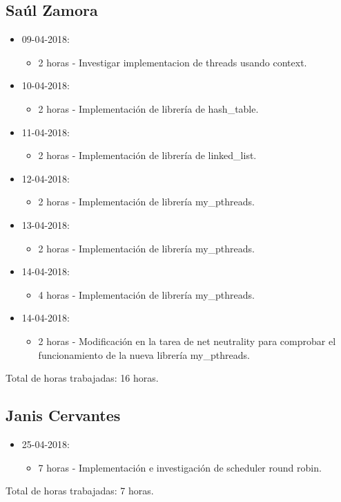 \documentclass{article}
\begin{document}
\subsection{Sa\'ul Zamora}
\begin{itemize}
  \item 09-04-2018:
  \begin{itemize}
    \item 2 horas - Investigar implementacion de threads usando context.
  \end{itemize}
  \item 10-04-2018:
  \begin{itemize}
    \item 2 horas - Implementaci\'on de librer\'ia de hash\_table.
  \end{itemize}
  \item 11-04-2018:
  \begin{itemize}
    \item 2 horas - Implementaci\'on de librer\'ia de linked\_list.
  \end{itemize}
  \item 12-04-2018:
  \begin{itemize}
    \item 2 horas - Implementaci\'on de librer\'ia my\_pthreads.
  \end{itemize}
  \item 13-04-2018:
  \begin{itemize}
    \item 2 horas - Implementaci\'on de librer\'ia my\_pthreads.
  \end{itemize}
  \item 14-04-2018:
  \begin{itemize}
    \item 4 horas - Implementaci\'on de librer\'ia my\_pthreads.
  \end{itemize}
  \item 14-04-2018:
  \begin{itemize}
    \item 2 horas - Modificaci\'on en la tarea de net neutrality para comprobar el funcionamiento de la nueva librer\'ia my\_pthreads.
  \end{itemize}
\end{itemize}
Total de horas trabajadas: 16 horas.

\subsection{Janis Cervantes}
\begin{itemize}
  \item 25-04-2018:
  \begin{itemize}
    \item 7 horas - Implementaci\'on e investigaci\'on de scheduler round robin.
  \end{itemize}
\end{itemize}
Total de horas trabajadas: 7 horas.
\end{document}
